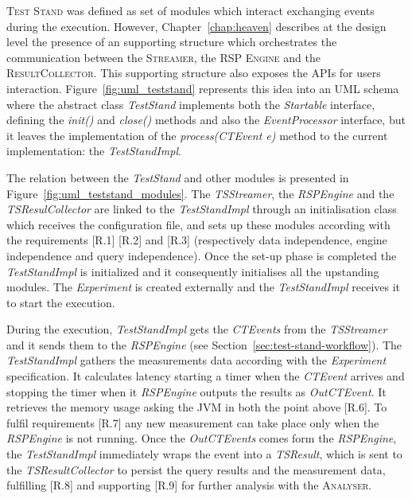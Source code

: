 \noindent \name \textsc{Test Stand} was defined as set of modules which interact exchanging events during the execution. However, Chapter~\ref{chap:heaven} describes at the design level the presence of an supporting structure which orchestrates the communication between the \textsc{Streamer}, the \textsc{RSP Engine} and the \textsc{ResultCollector}. This supporting structure also exposes the APIs for users interaction. Figure~\ref{fig:uml_teststand} represents this idea into an UML schema where the abstract class \textit{TestStand} implements both the \textit{Startable} interface, defining the \textit{init()} and \textit{close()} methods and also the \textit{EventProcessor} interface, but it leaves the implementation of the \textit{process(CTEvent e)} method to the current implementation: the \textit{TestStandImpl}. 

The relation between the \textit{TestStand} and other modules is presented in Figure~\ref{fig:uml_teststand_modules}. The \textit{TSStreamer}, the \textit{RSPEngine} and the \textit{TSResulCollector} are linked to the \textit{TestStandImpl} through an initialisation class which receives the configuration file, and sets up these modules according with the requirements [R.1]  [R.2] and [R.3] (respectively data independence, engine independence and query independence). Once the set-up phase is completed the \textit{TestStandImpl} is initialized and it consequently initialises all the upstanding modules. The \textit{Experiment} is created externally and  the \textit{TestStandImpl} receives it to start the execution. 

During the execution, \textit{TestStandImpl} gets the \textit{CTEvents} from the \textit{TSStreamer} and it sends them to the \textit{RSPEngine} (see Section~\ref{sec:test-stand-workflow}). The \textit{TestStandImpl} gathers the measurements data according with the \textit{Experiment} specification. It calculates latency starting a timer when the \textit{CTEvent} arrives and stopping the timer when it \textit{RSPEngine} outputs the results as \textit{OutCTEvent}. It retrieves the memory usage asking the JVM in both the point above [R.6]. To fulfil requirements [R.7] any new measurement can take place only when the \textit{RSPEngine} is not running. Once the \textit{OutCTEvents} comes form the \textit{RSPEngine}, the \textit{TestStandImpl} immediately wraps the event into a \textit{TSResult}, which is sent to the \textit{TSResultCollector} to persist the query results and the measurement data, fulfilling [R.8] and supporting [R.9] for further analysis with the \textsc{Analyser}.


